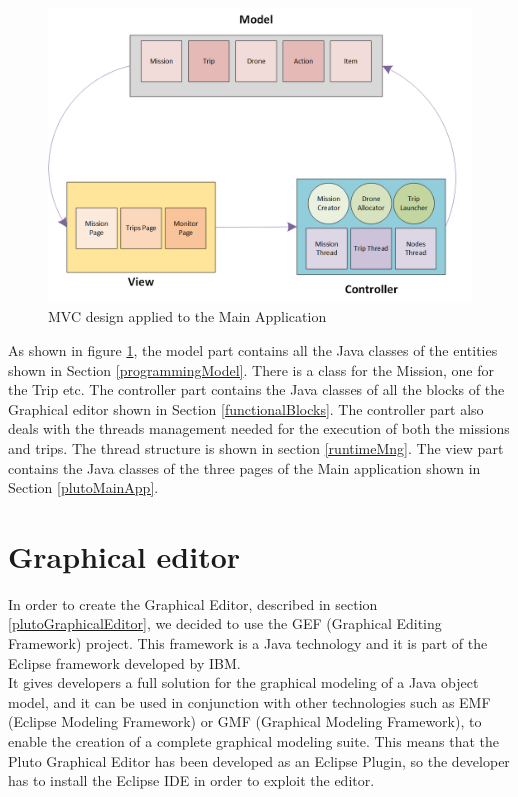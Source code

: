 \begin{figure}[h!]
\includegraphics[width=\linewidth]
{pictures/MVC.png}
\caption{MVC design applied to the Main Application}
\label{fig:mvc}
\end{figure}

As shown in figure \ref{fig:mvc}, the model part contains all the Java classes of the entities shown in Section \ref{programmingModel}.
There is a class for the Mission, one for the Trip etc.
The controller part contains the Java classes of all the blocks of the Graphical editor shown in Section \ref{functionalBlocks}.
The controller part also deals with the threads management needed for the execution of both the missions and trips. The thread structure is shown in section \ref{runtimeMng}.
The view part contains the Java classes of the three pages of the Main application shown in Section \ref{plutoMainApp}.
\\

\section{Graphical editor}\label{editor}

In order to create the Graphical Editor, described in section \ref{plutoGraphicalEditor}, we decided to use the GEF (Graphical Editing Framework) project. This framework is a Java technology and it is part of the Eclipse framework developed by IBM.
\\

It gives developers a full solution for the graphical modeling of a Java object model, and it can be used in conjunction with other technologies such as EMF (Eclipse Modeling Framework) or GMF (Graphical Modeling Framework), to enable the creation of a complete graphical modeling suite. 
This means that the Pluto Graphical Editor has been developed as an Eclipse Plugin, so the developer has to install the Eclipse IDE in order to exploit the editor.
\\

